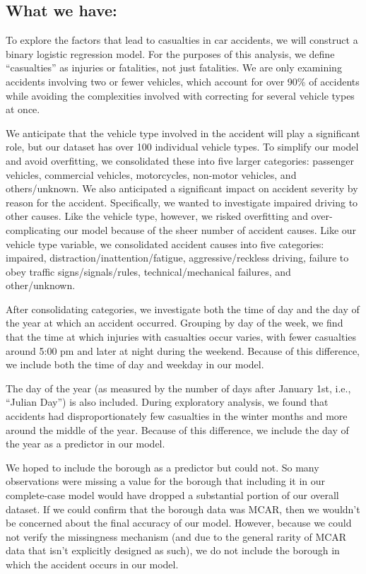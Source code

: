 \documentclass[
  letterpaper,
  DIV=11,
  numbers=noendperiod]{scrartcl}
\begin{document}
\hypertarget{what-we-have-1}{%
\subsection{What we have:}\label{what-we-have-1}}

To explore the factors that lead to casualties in car accidents, we will
construct a binary logistic regression model. For the purposes of this
analysis, we define ``casualties'' as injuries or fatalities, not just
fatalities. We are only examining accidents involving two or fewer
vehicles, which account for over 90\% of accidents while avoiding the
complexities involved with correcting for several vehicle types at once.

We anticipate that the vehicle type involved in the accident will play a
significant role, but our dataset has over 100 individual vehicle types.
To simplify our model and avoid overfitting, we consolidated these into
five larger categories: passenger vehicles, commercial vehicles,
motorcycles, non-motor vehicles, and others/unknown. We also anticipated
a significant impact on accident severity by reason for the accident.
Specifically, we wanted to investigate impaired driving to other causes.
Like the vehicle type, however, we risked overfitting and
over-complicating our model because of the sheer number of accident
causes. Like our vehicle type variable, we consolidated accident causes
into five categories: impaired, distraction/inattention/fatigue,
aggressive/reckless driving, failure to obey traffic
signs/signals/rules, technical/mechanical failures, and other/unknown.

After consolidating categories, we investigate both the time of day and
the day of the year at which an accident occurred. Grouping by day of
the week, we find that the time at which injuries with casualties occur
varies, with fewer casualties around 5:00 pm and later at night during
the weekend. Because of this difference, we include both the time of day
and weekday in our model.

The day of the year (as measured by the number of days after January
1st, i.e., ``Julian Day'') is also included. During exploratory
analysis, we found that accidents had disproportionately few casualties
in the winter months and more around the middle of the year. Because of
this difference, we include the day of the year as a predictor in our
model.

We hoped to include the borough as a predictor but could not. So many
observations were missing a value for the borough that including it in
our complete-case model would have dropped a substantial portion of our
overall dataset. If we could confirm that the borough data was MCAR,
then we wouldn't be concerned about the final accuracy of our model.
However, because we could not verify the missingness mechanism (and due
to the general rarity of MCAR data that isn't explicitly designed as
such), we do not include the borough in which the accident occurs in our
model.
\end{document}
